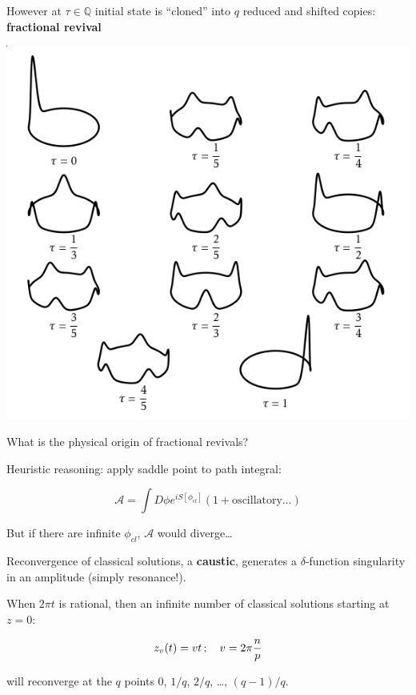 \documentclass{beamer}
\newcommand\inputpgf[2]{{
\let\pgfimageWithoutPath\pgfimage
\renewcommand{\pgfimage}[2][]{\pgfimageWithoutPath[##1]{#1/##2}}

}}
\begin{document}
\begin{frame}
    However at $\tau \in \mathbb{Q}$ initial state is ``cloned'' into $q$ reduced and shifted copies: \textbf{fractional revival}

    \begin{center} 
        \includegraphics[scale=0.4]{images/mergiata2}
    \end{center}
\end{frame}

\begin{frame}
    What is the physical origin of fractional revivals?

    \vfill

    Heuristic reasoning: apply saddle point to path integral:

    \begin{equation}
        \mathcal{A} = \int D\phi e^{iS[\phi_{cl}]} (1 + \text{oscillatory}\ldots)
        \label{}
    \end{equation}

    \vfill

    But if there are infinite $\phi_{cl}$, $\mathcal{A}$ would diverge\ldots

    \vfill
\end{frame}

\begin{frame}
    Reconvergence of classical solutions, a \textbf{caustic}, generates a $\delta$-function singularity in an amplitude (simply resonance!). 
    
    \vfill

    When $2\pi t$ is rational, then an infinite number of classical solutions starting at $z=0$:

    \begin{equation}
        z_v(t) = vt\,;\quad v = 2\pi {n \over p}
        \label{}
    \end{equation}


    will reconverge at the $q$ points $0$, $1/q$, $2/q$, \ldots, $(q-1)/q$.
\end{frame}

\begin{frame}
\makebox[\textwidth][c]{
    \scalebox{0.8}{\inputpgf{images/}{butterfly.pgf}} }
\end{frame}
\end{document}
